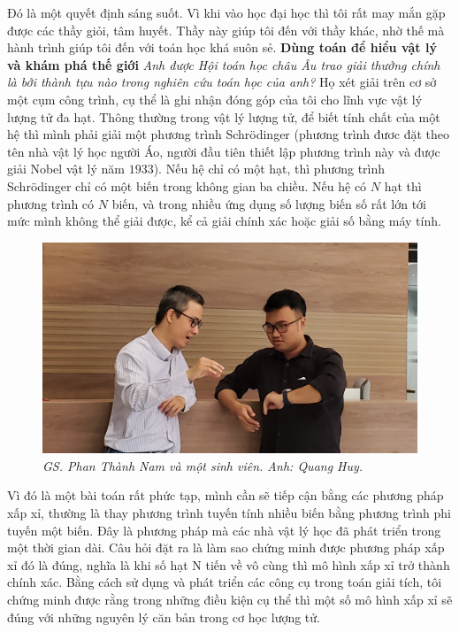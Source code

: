 \begin{multicols}{2}
	\vskip 0.1cm
	Đó là một quyết định sáng suốt. Vì khi vào học đại học thì tôi rất may mắn gặp được các thầy giỏi, tâm huyết. Thầy này giúp tôi đến với thầy khác, nhờ thế mà hành trình giúp tôi đến với toán học khá suôn sẻ. 
	\vskip 0.1cm
	\textbf{\color{diendantoanhoc}Dùng toán để hiểu vật lý và khám phá thế giới}
	\vskip 0.1cm 
	\textit{Anh được Hội toán học châu Âu trao giải thưởng chính là bởi thành tựu nào trong nghiên cứu toán học của anh?}
	\vskip 0.1cm 
	Họ xét giải trên cơ sở một cụm công trình, cụ thể là ghi nhận đóng góp của tôi cho lĩnh vực vật lý lượng tử đa hạt. Thông thường trong vật lý lượng tử, để biết tính chất của một hệ thì mình phải giải một phương trình Schrödinger (phương trình đươc đặt theo tên nhà vật lý học người Áo, người đầu tiên thiết lập phương trình này và được giải Nobel vật lý năm $1933$). Nếu hệ chỉ có một hạt, thì phương trình Schrödinger chỉ có một biến trong không gian ba chiều. Nếu hệ có $N$ hạt thì phương trình có $N$ biến, và trong nhiều ứng dụng số lượng biến số rất lớn tới mức mình không thể giải được, kể cả giải chính xác hoặc giải số bằng máy tính. 
	\begin{figure}[H]
		\centering
		\vspace*{-5pt}
		\captionsetup{labelformat= empty, justification=centering}
		\includegraphics[width=1\linewidth]{3}
		\caption{\small\textit{\color{diendantoanhoc}GS. Phan Thành Nam và một sinh viên. Anh: Quang Huy.}}
		\vspace*{-10pt}
	\end{figure}
	Vì đó là một bài toán rất phức tạp, mình cần sẽ tiếp cận bằng các phương pháp xấp xỉ, thường là thay phương trình tuyến tính nhiều biến bằng phương trình phi tuyến một biến. Đây là phương pháp mà các nhà vật lý học đã phát triển trong một thời gian dài. Câu hỏi đặt ra là làm sao chứng minh được phương pháp xấp xỉ đó là đúng, nghĩa là khi số hạt N tiến về vô cùng thì mô hình xấp xỉ trở thành chính xác. Bằng cách sử dụng và phát triển các công cụ trong toán giải tích, tôi chứng minh được rằng trong những điều kiện cụ thể thì một số mô hình xấp xỉ sẽ đúng với những nguyên lý căn bản trong cơ học lượng tử. 

\end{multicols}
